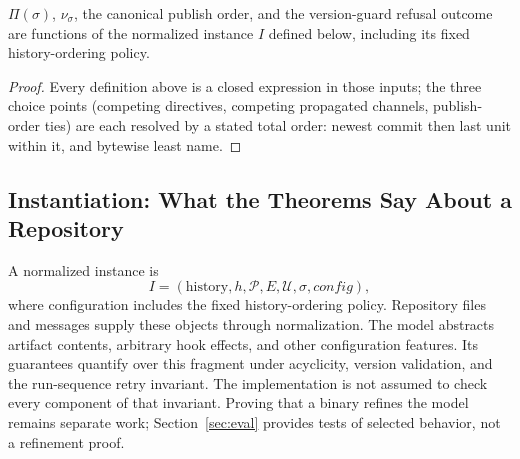\begin{theorem}[determinism]
\label{thm:det}
$\Pi(\sigma)$, $\nu_\sigma$, the canonical publish order, and the
version-guard refusal outcome are functions of the normalized instance $I$
defined below, including its fixed history-ordering policy.
\end{theorem}
\begin{proof}
Every definition above is a closed expression in those inputs; the three
choice points (competing directives, competing propagated channels,
publish-order ties) are each resolved by a stated total order: newest
commit then last unit within it, and bytewise least name.
\end{proof}

\subsection{Instantiation: What the Theorems Say About a Repository}
\label{sec:model:inst}

A normalized instance is
\[
 I=(\text{history},h,\mathcal P,E,\mathcal U,\sigma,\mathit{config}),
\]
where configuration includes the fixed history-ordering policy. Repository
files and messages supply these objects through normalization. The model
abstracts artifact contents, arbitrary hook effects, and other configuration
features. Its guarantees quantify over this fragment under acyclicity,
version validation, and the run-sequence retry invariant. The implementation
is not assumed to check every component of that invariant. Proving that a
binary refines the model remains separate work; Section~\ref{sec:eval}
provides tests of selected behavior, not a refinement proof.
